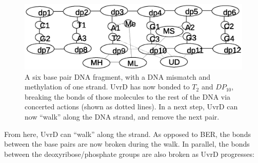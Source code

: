 \documentclass[review]{elsarticle}
\begin{document}
\begin{figure}[h!]
  \centering
    \includegraphics[width=1.0\textwidth]{mmr/state3}
  \caption[A six base pair DNA fragment.]{A six base pair DNA fragment, with a DNA mismatch and methylation of one strand. UvrD has now bonded to $T_2$ and $DP_{10}$, breaking the bonds of those molecules to the rest of the DNA via concerted actions (shown as dotted lines). In a next step, UvrD can now ``walk'' along the DNA strand, and remove the next pair.}
  \label{fig:state3}
\end{figure}

From here, UvrD can ``walk'' along the strand. As opposed to BER, the bonds between the base pairs are now broken during the walk. In parallel, the bonds between the deoxyribose/phosphate groups are also broken as UvrD progresses:
\end{document}
